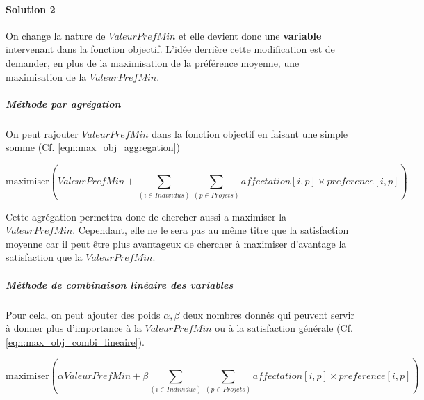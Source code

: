 \documentclass{polytech/polytech}
\begin{document}
\paragraph{Solution 2}
On change la nature de $ValeurPrefMin$ et elle devient donc une \textbf{variable} intervenant dans la fonction objectif.
L'idée derrière cette modification est de demander, en plus de la maximisation de la préférence moyenne, une maximisation de la $ValeurPrefMin$.

\subparagraph{Méthode par agrégation}
On peut rajouter $ValeurPrefMin$ dans la fonction objectif en faisant une simple somme (Cf. \eqref{eqn:max_obj_aggregation})

\begin{equation}
\label{eqn:max_obj_aggregation}
\text{maximiser} \left( ValeurPrefMin + \sum_{(i \in Individus)} \sum_{(p\in Projets)} affectation[i,p]\times preference[i,p] \right)
\end{equation}

Cette agrégation permettra donc de chercher aussi a maximiser la $ValeurPrefMin$. Cependant, elle ne le sera pas au même titre que la satisfaction moyenne car il peut être plus avantageux de chercher à maximiser d'avantage la satisfaction que la $ValeurPrefMin$.

\subparagraph{Méthode de combinaison linéaire des variables}
Pour cela, on peut ajouter des poids $\alpha, \beta$ deux nombres donnés qui peuvent servir à donner plus d'importance à la $ValeurPrefMin$ ou à la satisfaction générale (Cf. \eqref{eqn:max_obj_combi_lineaire}).

\begin{equation}
\label{eqn:max_obj_combi_lineaire}
\text{maximiser} \left( \alpha ValeurPrefMin + \beta \sum_{(i \in Individus)} \sum_{(p\in Projets)} affectation[i,p]\times preference[i,p] \right)
\end{equation}

\end{document}
